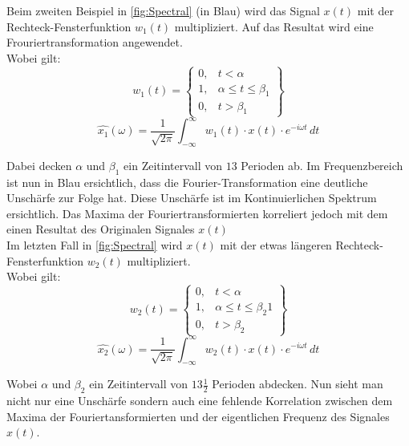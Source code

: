 Beim zweiten Beispiel in \ref{fig:Spectral} (in Blau) wird das Signal $x(t)$ mit der Rechteck-Fensterfunktion $w_{1}(t)$ multipliziert. Auf das Resultat wird eine Frouriertransformation angewendet.\\
Wobei gilt: 
\begin{equation}
	w_{1}(t)= \left\{\begin{array}{lll}{0,} & {t<\alpha}  \\ {1,}&{\alpha\leq t \leq\beta_{1}} \\ {0,} &{t>\beta_{1}}\end{array}\right\}
\end{equation}
\begin{equation}
	\hat{x_{1}}(\omega)=\frac{1}{\sqrt{2 \pi}} \int_{-\infty}^{\infty} w_{1}(t)\cdot x(t) \cdot e^{-i \omega t} \,dt
\end{equation}

Dabei decken $\alpha$ und $\beta_{1}$ ein Zeitintervall von $13$ Perioden ab. Im Frequenzbereich ist nun in Blau ersichtlich, dass die Fourier-Transformation eine deutliche Unschärfe zur Folge hat. Diese Unschärfe ist im Kontinuierlichen Spektrum ersichtlich. Das Maxima der Fouriertransformierten korreliert jedoch mit dem einen Resultat des Originalen Signales $x(t)$\\




Im letzten Fall in \ref{fig:Spectral} wird $x(t)$ mit der etwas längeren Rechteck-Fensterfunktion $w_{2}(t)$ multipliziert.\\
Wobei gilt: 
\begin{equation}
	w_{2}(t)= \left\{\begin{array}{lll}{0,}&{t<\alpha}  \\ {1,}&{\alpha\leq t \leq\beta_{2}}  {1}\\ {0,}&{t>\beta_{2}}\end{array}\right\}
\end{equation}
\begin{equation}
	\hat{x_{2}}(\omega)=\frac{1}{\sqrt{2 \pi}} \int_{-\infty}^{\infty} w_{2}(t)\cdot x(t) \cdot e^{-i \omega t} \,dt
\end{equation}

Wobei $\alpha$ und $\beta_{2}$ ein Zeitintervall von $13\frac{1}{2}$ Perioden abdecken. Nun sieht man nicht nur eine Unschärfe sondern auch eine fehlende Korrelation zwischen dem Maxima der Fouriertansformierten und der eigentlichen Frequenz des Signales $x(t)$.\\

